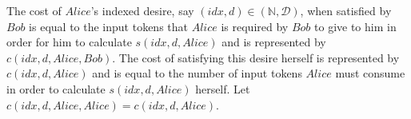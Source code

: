 \begin{definition}
  The cost of $Alice$'s indexed desire, say $\left(idx, d\right) \in \left(\mathbb{N}, \mathcal{D}\right)$, when satisfied by
  $Bob$ is equal to the input tokens that $Alice$ is required by $Bob$ to give to him in order for him to calculate
  $s\left(idx, d, Alice\right)$ and is represented by $c\left(idx, d, Alice, Bob\right)$. The cost of satisfying this desire
  herself is represented by $c\left(idx, d, Alice\right)$ and is equal to the number of input tokens $Alice$ must consume in
  order to calculate $s\left(idx, d, Alice\right)$ herself. Let $c\left(idx, d, Alice, Alice\right) = c\left(idx, d,
  Alice\right)$.
\end{definition}
